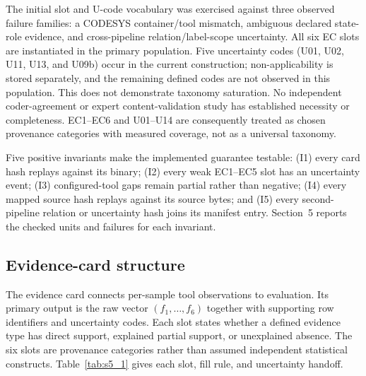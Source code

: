 \documentclass[manuscript,screen,review]{acmart}
\begin{document}
The initial slot and U-code vocabulary was exercised against three observed failure families: a CODESYS container/tool mismatch, ambiguous declared state-role evidence, and cross-pipeline relation/label-scope uncertainty. All six EC slots are instantiated in the primary population. Five uncertainty codes (U01, U02, U11, U13, and U09b) occur in the current construction; non-applicability is stored separately, and the remaining defined codes are not observed in this population. This does not demonstrate taxonomy saturation. No independent coder-agreement or expert content-validation study has established necessity or completeness. EC1--EC6 and U01--U14 are consequently treated as chosen provenance categories with measured coverage, not as a universal taxonomy.

Five positive invariants make the implemented guarantee testable: (I1) every card hash replays against its binary; (I2) every weak EC1--EC5 slot has an uncertainty event; (I3) configured-tool gaps remain partial rather than negative; (I4) every mapped source hash replays against its source bytes; and (I5) every second-pipeline relation or uncertainty hash joins its manifest entry. Section~5 reports the checked units and failures for each invariant.

\subsection{Evidence-card structure}

The evidence card connects per-sample tool observations to evaluation. Its primary output is the raw vector $(f_1,\ldots,f_6)$ together with supporting row identifiers and uncertainty codes. Each slot states whether a defined evidence type has direct support, explained partial support, or unexplained absence. The six slots are provenance categories rather than assumed independent statistical constructs. Table~\ref{tab:s5_1} gives each slot, fill rule, and uncertainty handoff.
\end{document}
